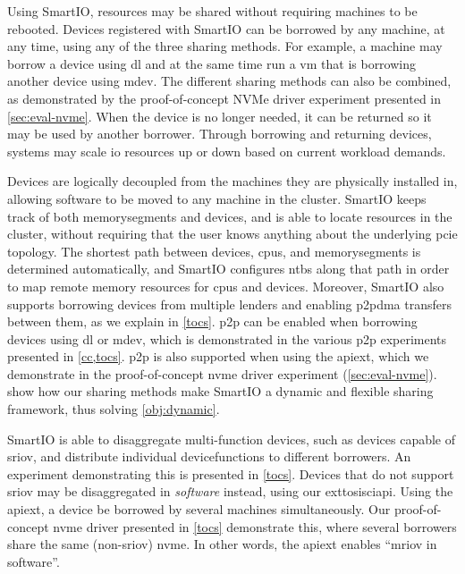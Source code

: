 \objdynamic*%
%
%
%
Using SmartIO, resources may be shared without requiring machines to be rebooted.
%
Devices registered with SmartIO can be borrowed by any machine, at any time, using any of the three sharing methods.
%
For example, a machine may borrow a device using \gls{dl} and at the same time run a \gls{vm} that is borrowing another device using \gls{mdev}.
%
The different sharing methods can also be combined, as demonstrated by the proof-of-concept NVMe driver experiment presented in \cref{sec:eval-nvme}.
%
When the device is no longer needed, it can be returned so it may be used by another \gls{borrower}.
%
Through borrowing and returning devices, systems may scale \gls{io} resources up or down based on current workload demands.



Devices are logically decoupled from the machines they are physically installed in, allowing software to be moved to any machine in the cluster.
%
SmartIO keeps track of both \glspl{memorysegment} and devices, and is able to locate resources in the cluster, without requiring that the user knows anything about the underlying \gls{pcie} topology.
%
The shortest path between devices, \glspl{cpu}, and \glspl{memorysegment} is determined automatically, and SmartIO configures \glspl{ntb} along that path in order to map remote memory resources for \glspl{cpu} and devices.
%
Moreover, SmartIO also supports borrowing devices from multiple \glspl{lender} and enabling \gls{p2pdma} transfers between them, as we explain in \cref{tocs}.
%
\Gls{p2p} can be enabled when borrowing devices using \gls{dl} or \gls{mdev}, which is demonstrated in the various \gls{p2p} experiments presented in \cref{cc,tocs}.
%
\Gls{p2p} is also supported when using the \gls{apiext}, which we demonstrate in the proof-of-concept \gls{nvme} driver experiment (\cref{sec:eval-nvme}).
%
 show how our sharing methods make SmartIO a dynamic and flexible sharing framework, thus solving \cref*{obj:dynamic}.




\objdisaggregation*%
%
SmartIO is able to \gls{disaggregate} multi-function devices, such as devices capable of \gls{sriov}, and distribute individual \glspl{devicefunction} to different \glspl{borrower}.
%
An experiment demonstrating this is presented in \cref{tocs}.
%
Devices that do not support \gls{sriov} may be \gls{disaggregated} in \emph{software} instead, using our \gls{exttosisciapi}.
%
Using the \gls{apiext}, a device be borrowed by several machines simultaneously.
%
Our proof-of-concept \gls{nvme} driver presented in \cref{tocs} demonstrate this, where several \glspl{borrower} share the same (non-\gls{sriov}) \gls{nvme}.
%
In other words, the \gls{apiext} enables ``\gls{mriov} in software''.



